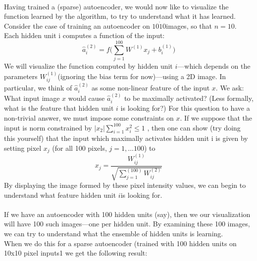 \documentclass[conference]{IEEEtran}
\begin{document}
\paragraph{}
Having trained a (sparse) autoencoder, 
we would now like to visualize the function learned 
by the algorithm, 
to try to understand what it has learned. 
Consider the case of training an autoencoder on
$10 \dot 10$images, so that $n = 10$. Each hidden unit i computes a function of the input:
\begin{equation}
    \hat{a}_i^{(2)} = f \Biggl( \sum_{j=1}^{100} W^{(1)}x_j + b_i^{(1)} \Biggr)
    \end{equation}
We will visualize the function computed by hidden unit $i$—which depends on the parameters
$W_{ij}^{(1)}$(ignoring the bias term for now)—using a 2D image. In particular, we think of 
$\hat{a}_i^{(2)}$ as some non-linear feature of the input $x$. We ask: What input image $x$ would cause 
$\hat{a}_i^{(2)}$ to be maximally activated? (Less formally, what is the feature that hidden unit $i$
is looking for?) For this question to have a non-trivial answer, we must impose some constraints on $x$. If we suppose that the input is norm constrained by 
$\lvert x_{2} \rvert \sum_{i=1}^{100} x_i^{2} \leq 1 $ , then one can show (try doing this yourself) that the input which maximally activates hidden unit 
i is given by setting pixel $x_j$  (for all 100 pixels, $j=1,\dots100$) to
\begin{equation}
    x_j = \frac{W_{ij}^{(1)}}{\sqrt{\sum_{j=1}^{(100)}W_{ij}^{(2)}}}
    \end{equation}
By displaying the image formed by these pixel intensity values, we can begin to understand what feature hidden unit
$i$is looking for.\\ \\
If we have an autoencoder with 100 hidden units (say), then we our visualization will have 100 such images—one per hidden unit. By examining these 100 images, we can try to understand what the ensemble of hidden units is learning.\\
When we do this for a sparse autoencoder (trained with 100 hidden units on 10x10 pixel inputs1 we get the following result:\\ \\
\end{document}
